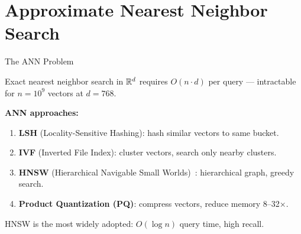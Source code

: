 \documentclass[aspectratio=169,10pt]{beamer}
\begin{document}
\section{Approximate Nearest Neighbor Search}

\begin{frame}{The ANN Problem}
  \begin{tcolorbox}[alertbox, title=Problem]
    Exact nearest neighbor search in $\mathbb{R}^d$ requires $O(n \cdot d)$ per query — intractable for
    $n = 10^9$ vectors at $d = 768$.
  \end{tcolorbox}
  \vspace{0.4em}
  \textbf{ANN approaches:}
  \begin{enumerate}
    \item \textbf{LSH} (Locality-Sensitive Hashing): hash similar vectors to same bucket.
    \item \textbf{IVF} (Inverted File Index): cluster vectors, search only nearby clusters.
    \item \textbf{HNSW} (Hierarchical Navigable Small Worlds)~\cite{malkov2018hnsw}: hierarchical graph, greedy search.
    \item \textbf{Product Quantization (PQ)}: compress vectors, reduce memory 8–32×.
  \end{enumerate}
  \vspace{0.3em}
  HNSW is the most widely adopted: $O(\log n)$ query time, high recall.
\end{frame}
\end{document}
